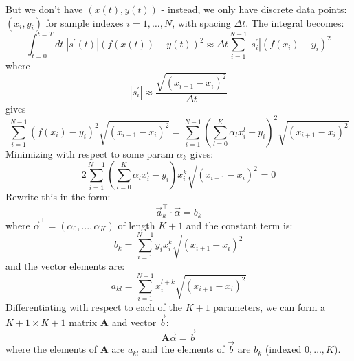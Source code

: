 \documentclass[11pt]{article}
\begin{document}
But we don't have $(x(t),y(t))$ - instead, we only have discrete data points: $(x_i, y_i)$ for sample indexes $i=1,\dots,N$, with spacing $\Delta t$. The integral becomes:
\begin{equation}
\int_{t=0}^{t=T} dt \; |s^\prime (t)| \left ( f(x(t)) - y(t) \right )^2
\approx
\Delta t \sum_{i=1}^{N-1} |s_i^\prime| \left ( f(x_i) - y_i \right )^2
\end{equation}
where
\begin{equation}
|s_i^\prime| \approx \frac{ \sqrt{ \left ( x_{i+1} - x_i \right )^2} }{ \Delta t }
\end{equation}
gives
\begin{equation}
\sum_{i=1}^{N-1} \left ( f(x_i) - y_i \right )^2 \sqrt{ \left ( x_{i+1} - x_i \right )^2} 
= 
\sum_{i=1}^{N-1} \left ( \sum_{l=0}^K \alpha_l x_i^l - y_i \right )^2
\sqrt{ \left ( x_{i+1} - x_i \right )^2}
\end{equation}
Minimizing with respect to some param $\alpha_k$ gives:
\begin{equation}
2 \sum_{i=1}^{N-1} \left ( \sum_{l=0}^K \alpha_l x_i^l - y_i \right ) x_i^k
\sqrt{ \left ( x_{i+1} - x_i \right )^2}
= 0
\end{equation}
Rewrite this in the form:
\begin{equation}
\vec{a}_k^\intercal \cdot \vec{\alpha} = b_k
\end{equation}
where $\vec{\alpha}^\intercal = (\alpha_0,\dots,\alpha_K)$ of length $K+1$ and the constant term is:
\begin{equation}
b_k = \sum_{i=1}^{N-1} y_i x_i^k \sqrt{ \left ( x_{i+1} - x_i \right )^2}
\end{equation}
and the vector elements are:
\begin{equation}
a_{kl} = \sum_{i=1}^{N-1} x_i^{l+k} \sqrt{ \left ( x_{i+1} - x_i \right )^2}
\end{equation}
Differentiating with respect to each of the $K+1$ parameters, we can form a $K+1\times K+1$ matrix $\boldsymbol{A}$ and vector $\vec{b}$:
\begin{equation}
\boldsymbol{A} \vec{\alpha} = \vec{b}
\end{equation}
where the elements of $\boldsymbol{A}$ are $a_{kl}$ and the elements of $\vec{b}$ are $b_k$ (indexed $0,\dots,K$).
\end{document}
